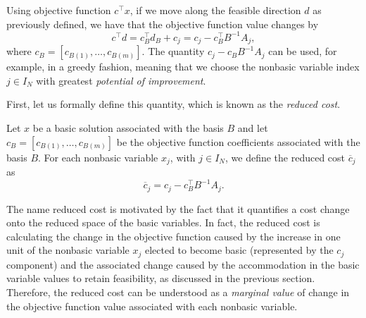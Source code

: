 Using objective function $c^\top x$, if we move along the feasible direction $d$ as previously defined, we have that the objective function value changes by 
%
\begin{equation*}
	c^\top d = c_B^\top d_B + c_j = c_j - c_B^\top B^{-1}A_j,
\end{equation*}
%
where $c_B = [c_{B(1)}, \dots, c_{B(m)}]$. The quantity $c_j - c_BB^{-1}A_j$ can be used, for example, in a greedy fashion, meaning that we choose the nonbasic variable index $j \in I_N$ with greatest \emph{potential of improvement}.

First, let us formally define this quantity, which is known as the \emph{reduced cost}. 

\begin{definition}
	Let $x$ be a basic solution associated with the basis $B$ and let $c_B = [c_{B(1)}, \dots, c_{B(m)}]$ be the objective function coefficients associated with the basis $B$. For each nonbasic variable $x_j$, with $j \in I_N$, we define the reduced cost $\overline{c}_j$ as
	\begin{equation*}
		\overline{c}_j = c_j - c_B^\top B^{-1}A_j.
	\end{equation*}
\end{definition}

The name reduced cost is motivated by the fact that it quantifies a cost change onto the reduced space of the basic variables. In fact, the reduced cost is calculating the change in the objective function caused by the increase in one unit of the nonbasic variable $x_j$ elected to become basic (represented by the $c_j$ component) and the associated change caused by the accommodation in the basic variable values to retain feasibility, as discussed in the previous section. Therefore, the reduced cost can be understood as a \emph{marginal value} of change in the objective function value associated with each nonbasic variable.


